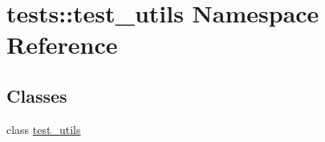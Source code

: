 \hypertarget{namespacetests_1_1test__utils}{\section{tests\-:\-:test\-\_\-utils \-Namespace \-Reference}
\label{namespacetests_1_1test__utils}
}
\subsection*{\-Classes}
\begin{DoxyCompactItemize}
\item 
class \hyperlink{classtests_1_1test__utils_1_1test__utils}{test\-\_\-utils}
\end{DoxyCompactItemize}

